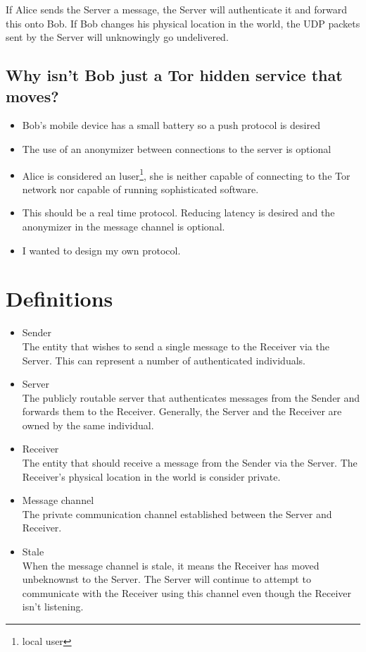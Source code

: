 \documentclass[11pt]{article}
\begin{document}
If Alice sends the Server a message, the Server will authenticate it and
forward this onto Bob. If Bob changes his physical location in the world, the
UDP packets sent by the Server will unknowingly go undelivered.

\subsection*{Why isn't Bob just a Tor hidden service that moves?}
\begin{itemize}
\item Bob's mobile device has a small battery so a push protocol is desired
\item The use of an anonymizer between connections to the server is optional
\item Alice is considered an luser\footnote{local user}, she is neither capable
of connecting to the Tor network nor capable of running sophisticated software.
\item This should be a real time protocol. Reducing latency is desired and the
anonymizer in the message channel is optional.
\item I wanted to design my own protocol.
\end{itemize}

\pagebreak
\section*{Definitions}
\begin{itemize}
\item Sender \\
The entity that wishes to send a single message to the Receiver via the Server.
This can represent a number of authenticated individuals.
\item Server \\
The publicly routable server that authenticates messages from the Sender and
forwards them to the Receiver. Generally, the Server and the Receiver are
owned by the same individual.
\item Receiver \\
The entity that should receive a message from the Sender via the Server. The
Receiver's physical location in the world is consider private.
\item Message channel \\
The private communication channel established between the Server and Receiver.
\item Stale \\
When the message channel is stale, it means the Receiver has moved unbeknownst
to the Server. The Server will continue to attempt to communicate with the
Receiver using this channel even though the Receiver isn't listening.
\end{itemize}
\pagebreak
\end{document}
